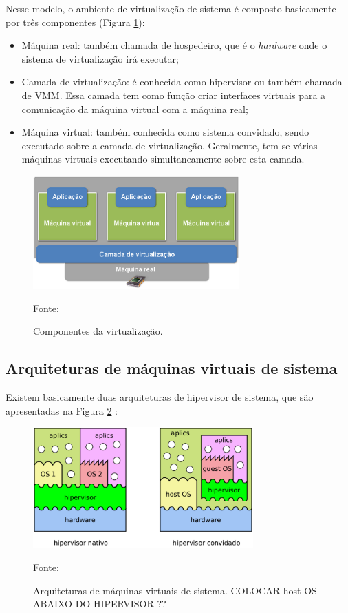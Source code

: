 Nesse modelo, o ambiente de virtualização de sistema é composto basicamente por três componentes (Figura \ref{fig:virtcomponentes}):
\begin{itemize}
 \item Máquina real: também chamada de hospedeiro, que é o \textit{hardware} onde o sistema de virtualização irá executar;
 \item Camada de virtualização: é conhecida como hipervisor ou também chamada de \ac{VMM}. Essa camada tem como função criar interfaces 
 virtuais para a comunicação da máquina virtual com a máquina real;
 \item Máquina virtual: também conhecida como sistema convidado, sendo executado sobre a camada de virtualização. Geralmente, tem-se
 várias máquinas virtuais executando simultaneamente sobre esta camada.
\end{itemize}

\begin{figure}[h!]
 \centering
 \includegraphics[width=300px]{img/virtcomponentes.eps}
 \caption{Componentes da virtualização.}
 \label{fig:virtcomponentes}
 Fonte: \citet{andrade2011}
\end{figure}

\subsection{Arquiteturas de máquinas virtuais de sistema}
\label{section:virtarquit}

Existem basicamente duas arquiteturas de hipervisor de sistema, que são apresentadas na Figura \ref{fig:vms_arquiteturas} \cite{maziero2013}:

\begin{figure}[vms_arquiteturas]
 \centering
 \includegraphics[width=320px]{img/vms_arquiteturas.eps}
 \caption{Arquiteturas de máquinas virtuais de sistema. COLOCAR host OS ABAIXO DO HIPERVISOR ??}
 \label{fig:vms_arquiteturas}
 Fonte: \citet{maziero2013}
\end{figure}


